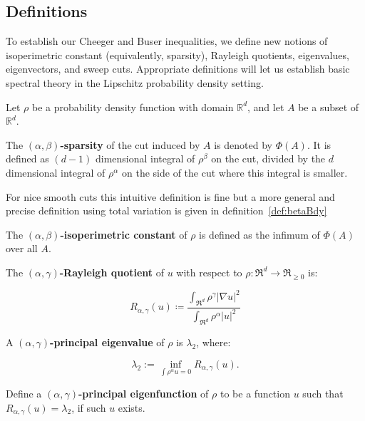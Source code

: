 \subsection{Definitions}\label{sec:definitions}
To establish our Cheeger and Buser inequalities, we define new
notions of isoperimetric constant (equivalently, sparsity), Rayleigh
quotients, eigenvalues, eigenvectors, and sweep cuts. Appropriate
definitions will let us establish basic spectral theory in the Lipschitz
probability density setting.

\vspace{2 mm}

\begin{definition} Let $\rho$ be a probability density function with domain
  $\mathbb{R}^d$, and let $A$ be a
  subset of $\mathbb{R}^d$.

  The \textbf{$(\alpha, \beta)$-sparsity} of the cut induced by $A$ is
  denoted by $\Phi(A)$. It is defined as $(d-1)$ dimensional integral of $\rho^\beta$ on the cut, divided
  by the $d$ dimensional integral of $\rho^\alpha$ on the side of the
  cut where this integral is smaller.  \end{definition}

For nice smooth cuts this
  intuitive definition is fine but a more general and precise
  definition using total variation is given in
  definition~\ref{def:betaBdy}

  \begin{definition}
The \textbf{$(\alpha, \beta)$-isoperimetric constant} of
  $\rho$ is defined as the infimum of $\Phi(A)$ over all $A$.
  \end{definition}

\vspace{2 mm}

\begin{definition}
The \textbf{$(\alpha, \gamma)$-Rayleigh quotient} of $u$ with
respect to $\rho:\Re^d \to \Re_{\geq 0}$ is:

\[
  R_{\alpha, \gamma}(u) \coloneqq \frac{\int_{\Re^d} \rho^\gamma
  |\nabla u|^2}{\int_{\Re^d} \rho^{\alpha}|u|^2} 
\]

A \textbf{$(\alpha, \gamma)$-principal eigenvalue} of $\rho$ is
$\lambda_2$, where:

\[ \lambda_2 := \inf_{\int \rho^\alpha u = 0} R_{\alpha, \gamma}(u). \]

Define a \textbf{$(\alpha, \gamma)$-principal eigenfunction} of
$\rho$ to be a function $u$ such that $R_{\alpha, \gamma}(u) =
\lambda_2$, if such $u$ exists.
\end{definition}
\vspace{2 mm}


